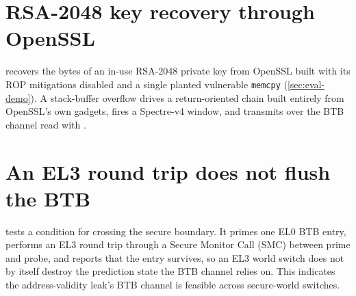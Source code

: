 \section{RSA-2048 key recovery through OpenSSL}
\label{app:poc-openssl}

 recovers the bytes of an in-use RSA-2048 private key from OpenSSL built with its ROP
mitigations disabled and a single planted vulnerable \texttt{memcpy} (\autoref{sec:eval-demo}). A
stack-buffer overflow drives a return-oriented chain built entirely from OpenSSL's own gadgets,
fires a Spectre-v4 window, and transmits over the BTB channel read with .

\section{An EL3 round trip does not flush the BTB}
\label{app:poc-smc}

 tests a condition for crossing the secure boundary. It primes one EL0 BTB entry,
performs an EL3 round trip through a Secure Monitor Call (SMC) between prime and probe, and reports
that the entry survives, so an EL3 world switch does not by itself destroy the prediction state the
BTB channel relies on. This indicates the address-validity leak's BTB channel is feasible across
secure-world switches.
